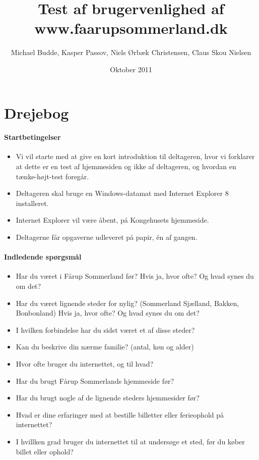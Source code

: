 \documentclass[10pt,a4paper]{article}      %
\author{Michael Budde, Kasper Passov, Niels Ørbæk Christensen, Claus Skou Nielsen}
\title{Test af brugervenlighed af www.faarupsommerland.dk}
\date{Oktober 2011}
\begin{document}
\hfuzz=50pt
\maketitle
\newpage
\setcounter{page}{1}

\section*{Drejebog}

\paragraph{Startbetingelser}
\begin{itemize}
\item Vi vil starte med at give en kort introduktion til deltageren, hvor vi
forklarer at dette er en test af hjemmesiden og ikke af deltageren, og hvordan
en tænke-højt-test foregår.
\item Deltageren skal bruge en Windows-datamat med Internet Explorer 8
installeret.
\item Internet Explorer vil være åbent, på Kongehusets hjemmeside.
\item Deltagerne får opgaverne udleveret på papir, én af gangen.
\end{itemize}

\paragraph{Indledende spørgsmål}
\begin{itemize}
\item Har du været i Fårup Sommerland før? Hvis ja, hvor ofte? Og hvad synes du
om det?
\item Har du været lignende steder for nylig? (Sommerland Sjælland, Bakken,
Bonbonland) Hvis ja, hvor ofte? Og hvad synes du om det?
\item I hvilken forbindelse har du sidst været et af disse steder?
\item Kan du beskrive din nærme familie? (antal, køn og alder)
\item Hvor ofte bruger du internettet, og til hvad?
\item Har du brugt Fårup Sommerlands hjemmeside før?
\item Har du brugt nogle af de lignende steders hjemmesider før?
\item Hvad er dine erfaringer med at bestille billetter eller ferieophold på
internettet?
\item I hvillken grad bruger du internettet til at undersøge et sted, før du
køber billet eller ophold?
\end{itemize}
\end{document}
